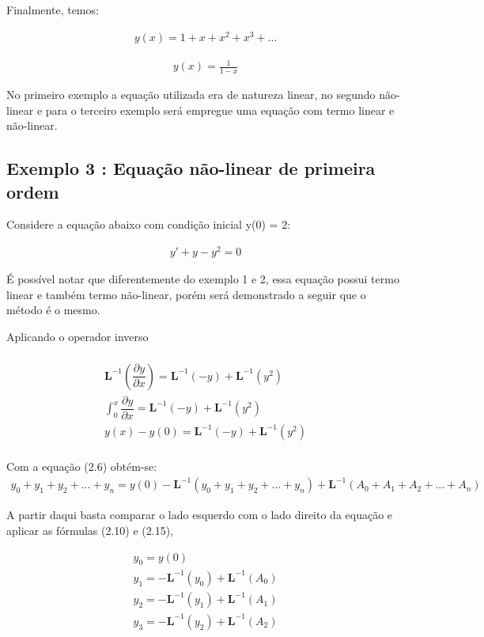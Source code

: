 Finalmente, temos:

\begin{gather*}
y(x) = 1 + x+ x^2 + x^3 +...
\end{gather*}

\begin{gather*}
y(x) = \frac {1}{1-x}
\end{gather*}

No primeiro exemplo a equação utilizada era de natureza linear, no segundo não-linear e para o terceiro exemplo será empregue uma equação  com termo linear e não-linear.

\subsection{Exemplo 3 : Equação não-linear de primeira ordem}

Considere a equação abaixo com condição inicial y(0) = 2:

\begin{gather*}
y' + y - y^2 = 0
\end{gather*}

É possível notar que diferentemente do exemplo 1 e 2, essa equação possui termo linear e também termo não-linear, porém será demonstrado a seguir que o método é o mesmo.

Aplicando o operador inverso

\begin{gather*}\nonumber\\
 \textbf{L}^{-1}\left(\dfrac{\partial y}{\partial x}\right) = \textbf{L}^{-1}(-y) + \textbf{L}^{-1}(y^2)\nonumber\\
 \int_0^{x}\dfrac{\partial y}{\partial x} = \textbf{L}^{-1} (-y) + \textbf{L}^{-1} (y^2)\nonumber\\
 y(x)-y(0) = \textbf{L}^{-1} (-y) + \textbf{L}^{-1} (y^2)\nonumber\\
 \end{gather*}

Com a equação (2.6) obtém-se:
\begin{gather*}
 y_{0} +y_{1} + y_{2} + ... + y_{n}  =  y(0) - \textbf{L}^{-1}( y_{0} +y_{1} + y_{2} + ... + y_{n} ) +\textbf{L}^{-1}( A_{0} +A_{1} + A_{2} + ... + A_{n})
 \end{gather*}

A partir daqui basta comparar o lado esquerdo com o lado direito da equação e aplicar as fórmulas (2.10) e (2.15),

\begin{gather*}
y_{0} = y(0)\nonumber\\
y_{1} = -\textbf{L}^{-1}(y_{0}) + \textbf{L}^{-1}(A_{0})\nonumber\\
y_{2} = -\textbf{L}^{-1}(y_{1}) + \textbf{L}^{-1}(A_{1})\nonumber\\
y_{3} = -\textbf{L}^{-1}(y_{2}) + \textbf{L}^{-1}(A_{2})\nonumber\\
\end{gather*}


